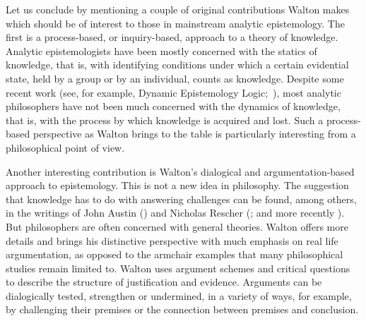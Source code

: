 \documentclass[12pt,a4paper]{article}
\begin{document}

Let us conclude by mentioning 
a couple of original contributions Walton makes 
which should be of interest to those 
in mainstream analytic epistemology. The first is a process-based, or
inquiry-based, approach to a theory of knowledge. Analytic
epistemologists have been mostly concerned with the statics of knowledge, 
that is, with identifying conditions under which a certain
evidential state, held by a group or by an individual, counts as
knowledge. Despite some recent work (see, for example, 
Dynamic Epistemology Logic;~\citealp{baltagRenne2016}), most analytic philosophers have not
been much concerned with the dynamics of knowledge, that is, with
the process by which knowledge is acquired and lost. Such a process-based
perspective as Walton brings to the table is particularly interesting
from a philosophical point of view. 

Another interesting contribution is Walton's dialogical and argumentation-based 
approach to epistemology. This is not a new idea in philosophy. The suggestion 
that knowledge has to do with answering challenges can be found, among others,
in the writings of John Austin (\citeyear{austin1962}) and Nicholas Rescher (\citeyear{rescher1977}; and more recently \citeyear{rescher2003,rescher2005}). 
But philosophers are often concerned with general 
theories. Walton offers more details and 
brings his distinctive perspective with much emphasis on real life argumentation, as opposed to the armchair examples that many philosophical studies remain limited to.
Walton uses argument schemes and critical questions
to describe the structure of justification and evidence. 
Arguments can be dialogically tested, strengthen or undermined, 
in a variety of ways, for example, by challenging their premises 
or the connection between premises and conclusion.  
\end{document}
